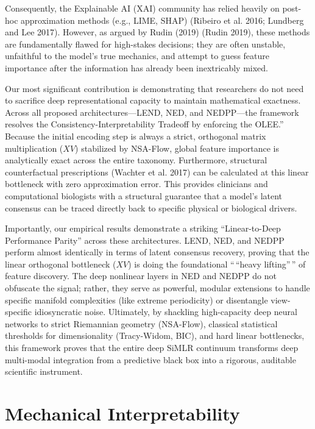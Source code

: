 \documentclass[
  letterpaper,
]{report}
\begin{document}
Consequently, the Explainable AI (XAI) community has relied heavily on
post-hoc approximation methods (e.g., LIME, SHAP) (Ribeiro et al. 2016;
Lundberg and Lee 2017). However, as argued by Rudin (2019) (Rudin 2019),
these methods are fundamentally flawed for high-stakes decisions; they
are often unstable, unfaithful to the model's true mechanics, and
attempt to guess feature importance after the information has already
been inextricably mixed.

Our most significant contribution is demonstrating that researchers do
not need to sacrifice deep representational capacity to maintain
mathematical exactness. Across all proposed architectures---LEND, NED,
and NEDPP---the framework resolves the Consistency-Interpretability
Tradeoff by enforcing the OLEE.'' Because the initial encoding step is
always a strict, orthogonal matrix multiplication (\(XV\)) stabilized by
NSA-Flow, global feature importance is analytically exact across the
entire taxonomy. Furthermore, structural counterfactual prescriptions
(Wachter et al. 2017) can be calculated at this linear bottleneck with
zero approximation error. This provides clinicians and computational
biologists with a structural guarantee that a model's latent consensus
can be traced directly back to specific physical or biological drivers.

Importantly, our empirical results demonstrate a striking
``Linear-to-Deep Performance Parity'' across these architectures. LEND,
NED, and NEDPP perform almost identically in terms of latent consensus
recovery, proving that the linear orthogonal bottleneck (\(XV\)) is
doing the foundational ``\,``heavy lifting''\,'' of feature discovery.
The deep nonlinear layers in NED and NEDPP do not obfuscate the signal;
rather, they serve as powerful, modular extensions to handle specific
manifold complexities (like extreme periodicity) or disentangle
view-specific idiosyncratic noise. Ultimately, by shackling
high-capacity deep neural networks to strict Riemannian geometry
(NSA-Flow), classical statistical thresholds for dimensionality
(Tracy-Widom, BIC), and hard linear bottlenecks, this framework proves
that the entire deep SiMLR continuum transforms deep multi-modal
integration from a predictive black box into a rigorous, auditable
scientific instrument.

\section{Mechanical Interpretability}\label{mechanical-interpretability}
\end{document}
